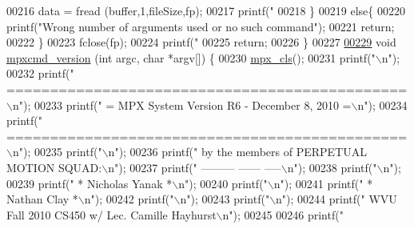 \begin{DoxyCode}
{{{{{{{{{00216                 data = fread (buffer,1,fileSize,fp);
00217                 printf(\textcolor{stringliteral}{"%
00218         \}
00219         \textcolor{keywordflow}{else}\{
00220                 printf(\textcolor{stringliteral}{"Wrong number of arguments used or no such command"});    
00221                 \textcolor{keywordflow}{return};
00222         \}
00223         fclose(fp);
00224         printf(\textcolor{stringliteral}{"%
00225         \textcolor{keywordflow}{return};
00226 \}
00227 
\hypertarget{_m_p_x___c_m_d_8_c_source_l00229}{}\hyperlink{mpx__cmd_8h_a70a1ce3926ea7c41321ab42b4161df0d}{00229} \textcolor{keywordtype}{void} \hyperlink{_m_p_x___c_m_d_8_c_a70a1ce3926ea7c41321ab42b4161df0d}{mpxcmd_version} (\textcolor{keywordtype}{int} argc, \textcolor{keywordtype}{char} *argv[]) \{
00230         \hyperlink{mpx__util_8c_a8cf3281978ba1652fd5d643e1a41f70b}{mpx_cls}();
00231         printf(\textcolor{stringliteral}{"\(\backslash\)n"});
00232         printf(\textcolor{stringliteral}{"  ==============================================\(\backslash\)n"});
00233         printf(\textcolor{stringliteral}{"  = MPX System Version R6 - December  8, 2010 =\(\backslash\)n"});
00234         printf(\textcolor{stringliteral}{"  ==============================================\(\backslash\)n"});
00235         printf(\textcolor{stringliteral}{"\(\backslash\)n"});
00236         printf(\textcolor{stringliteral}{"      by the members of PERPETUAL MOTION SQUAD:\(\backslash\)n"});
00237         printf(\textcolor{stringliteral}{"                        --------- ------ -----\(\backslash\)n"});
00238         printf(\textcolor{stringliteral}{"\(\backslash\)n"});
00239         printf(\textcolor{stringliteral}{"                     *  Nicholas Yanak  *\(\backslash\)n"});
00240         printf(\textcolor{stringliteral}{"\(\backslash\)n"});
00241         printf(\textcolor{stringliteral}{"                             *  Nathan Clay  *\(\backslash\)n"});
00242         printf(\textcolor{stringliteral}{"\(\backslash\)n"});
00243         printf(\textcolor{stringliteral}{"\(\backslash\)n"});
00244         printf(\textcolor{stringliteral}{"  WVU Fall 2010 CS450 w/ Lec. Camille Hayhurst\(\backslash\)n"});
00245 
00246         printf(\textcolor{stringliteral}{"%
}}}}}}}}}}}}
\end{DoxyCode}
